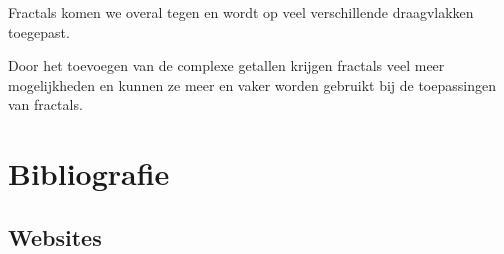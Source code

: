 \documentclass[11pt,fleqn]{book} %
\begin{document}
Fractals komen we overal tegen en wordt op veel verschillende draagvlakken toegepast.

Door het toevoegen van de complexe getallen krijgen fractals veel meer mogelijkheden en kunnen ze meer en vaker worden gebruikt bij de toepassingen van fractals. 


\chapter*{Bibliografie}




\section*{Websites}
\printbibliography[heading=bibempty,type=online]
\printbibliography[heading=bibempty,type=misc]




\end{document}
